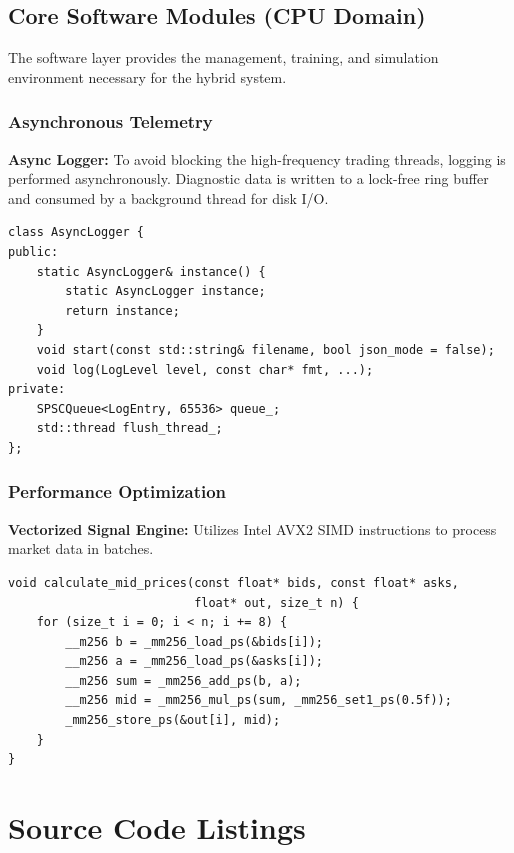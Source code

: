 \section{Core Software Modules (CPU Domain)}

The software layer provides the management, training, and simulation environment necessary for the hybrid system.

\subsection{Asynchronous Telemetry}
\textbf{Async Logger:} To avoid blocking the high-frequency trading threads, logging is performed asynchronously. Diagnostic data is written to a lock-free ring buffer and consumed by a background thread for disk I/O.

\begin{lstlisting}[style=cppstyle, caption={High-performance asynchronous logger interface}, label={lst:logger_a}]
class AsyncLogger {
public:
    static AsyncLogger& instance() {
        static AsyncLogger instance;
        return instance;
    }
    void start(const std::string& filename, bool json_mode = false);
    void log(LogLevel level, const char* fmt, ...);
private:
    SPSCQueue<LogEntry, 65536> queue_;
    std::thread flush_thread_;
};
\end{lstlisting}

\subsection{Performance Optimization}
\textbf{Vectorized Signal Engine:} Utilizes Intel AVX2 SIMD instructions to process market data in batches. \datamethodology

\begin{lstlisting}[style=cppstyle, caption={AVX2 Mid-price calculation}, label={lst:simd_a}]
void calculate_mid_prices(const float* bids, const float* asks, 
                          float* out, size_t n) {
    for (size_t i = 0; i < n; i += 8) {
        __m256 b = _mm256_load_ps(&bids[i]);
        __m256 a = _mm256_load_ps(&asks[i]);
        __m256 sum = _mm256_add_ps(b, a);
        __m256 mid = _mm256_mul_ps(sum, _mm256_set1_ps(0.5f));
        _mm256_store_ps(&out[i], mid);
    }
}
\end{lstlisting}

\chapter{Source Code Listings}
\label{appendix:code}


